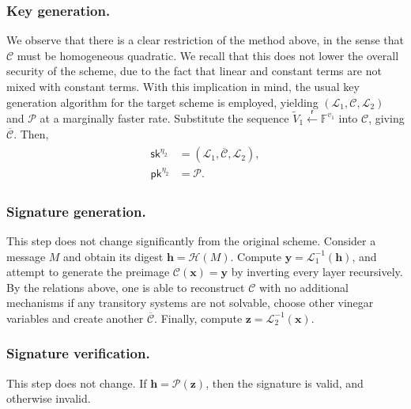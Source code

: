 \documentclass[12pt, a4paper, oneside]{memoir}
\newcommand{\random}{\overset{\mathsf{r}}{\gets}}
\theoremstyle{definition}
\begin{document}

\subsubsection{Key generation.}

We observe that there is a clear restriction of the method above, in the sense that $\mathcal{C}$ must be homogeneous quadratic. We recall that this does not lower the overall security of the scheme, due to the fact that linear and constant terms are not mixed with constant terms. With this implication in mind, the usual key generation algorithm for the target scheme is employed, yielding $(\mathcal{L}_{1}, \mathcal{C}, \mathcal{L}_{2})$ and $\mathcal{P}$ at a marginally faster rate. Substitute the sequence $\widetilde{V}_{1} \random \mathbb{F}^{v_{1}}$ into $\mathcal{C}$, giving $\overline{\mathcal{C}}$. Then, 
\begin{align}
  \begin{split}
    \mathsf{sk}^{\eta_{2}} &= (\mathcal{L}_{1}, \overline{\mathcal{C}}, \mathcal{L}_{2}), \\
    \mathsf{pk}^{\eta_{2}} &= \mathcal{P}.
  \end{split}
\end{align}

\subsubsection{Signature generation.}

This step does not change significantly from the original scheme. Consider a message $M$ and obtain its digest $\mathbf{h} = \mathcal{H}(M)$. Compute $\mathbf{y} = \mathcal{L}_{1}^{-1}(\mathbf{h})$, and attempt to generate the preimage $\mathcal{C}(\mathbf{x}) = \mathbf{y}$ by inverting every layer recursively. By the relations above, one is able to reconstruct $\mathcal{C}$ with no additional mechanisms if any transitory systems are not solvable, choose other vinegar variables and create another $\overline{\mathcal{C}}$. Finally, compute $\mathbf{z} = \mathcal{L}_{2}^{-1}(\mathbf{x})$.

\subsubsection{Signature verification.}

This step does not change. If $\mathbf{h} = \mathcal{P}(\mathbf{z})$, then the signature is valid, and otherwise invalid.
\end{document}
